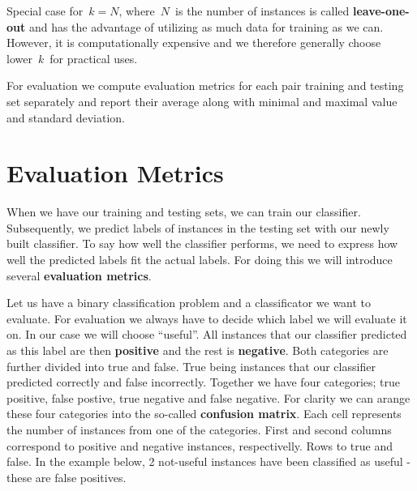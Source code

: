 Special case for~$k=N$,  where~$N$~is the number of instances is called {\bf leave-one-out} and has the advantage of 
utilizing as much data for training as we can.
However, it is computationally expensive and we therefore generally choose lower~$k$~for practical uses. 

For evaluation we compute evaluation metrics for each pair  training and testing set separately and report their average along with minimal and maximal value and standard deviation. 



\section{Evaluation Metrics}

When we have our training and testing sets, we can train our classifier.
Subsequently, we predict labels of instances in the testing set with our newly
built classifier.
To say how well the classifier performs, we need to express how well the predicted
labels fit the actual labels.
For doing this we will introduce several {\bf evaluation metrics}.

Let us have a binary classification problem and a classificator we want to evaluate.
For evaluation we always have to decide which label we will evaluate it on.
In our case we will choose ``useful''.
All instances that our classifier predicted as this label are then {\bf positive} and the rest is {\bf negative}.
Both categories are further divided into true and false.
True being instances that our classifier predicted correctly and false incorrectly.
Together we have four categories;
true positive, false postive, true negative and false negative.
For clarity we can arange these four categories into the so-called {\bf confusion matrix}.
Each cell represents the number of instances from one of the categories.
First and second columns correspond to positive and negative instances, respectivelly.
Rows to true and false.
In the example below, 2 not-useful instances have been classified as useful - these are false positives.

